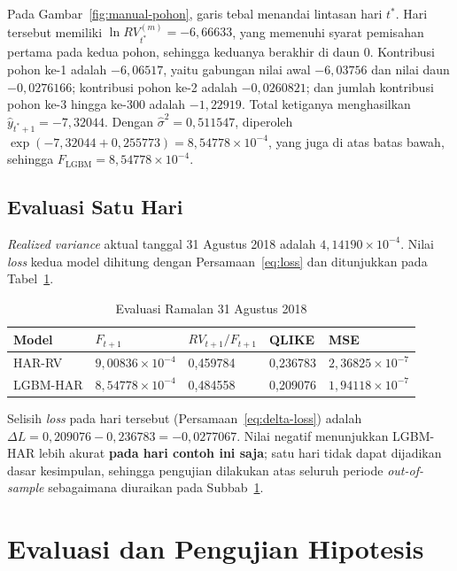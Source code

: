 Pada Gambar~\ref{fig:manual-pohon}, garis tebal menandai lintasan hari $t^*$.
Hari tersebut memiliki $\ln RV^{(m)}_{t^*} = -6{,}66633$, yang memenuhi syarat
pemisahan pertama pada kedua pohon, sehingga keduanya berakhir di daun 0.
Kontribusi pohon ke-1 adalah $-6{,}06517$, yaitu gabungan nilai awal
$-6{,}03756$ dan nilai daun $-0{,}0276166$; kontribusi pohon ke-2 adalah
$-0{,}0260821$; dan jumlah kontribusi pohon ke-3 hingga ke-300 adalah
$-1{,}22919$. Total ketiganya menghasilkan $\hat y_{t^*+1} = -7{,}32044$.
Dengan $\hat\sigma^2 = 0{,}511547$, diperoleh
$\exp(-7{,}32044 + 0{,}255773) = 8{,}54778 \times 10^{-4}$, yang juga di atas
batas bawah, sehingga $F_{\text{LGBM}} = 8{,}54778 \times 10^{-4}$.

\subsection{Evaluasi Satu Hari}
\textit{Realized variance} aktual tanggal 31 Agustus 2018 adalah
$4{,}14190 \times 10^{-4}$. Nilai \textit{loss} kedua model dihitung dengan
Persamaan~\eqref{eq:loss} dan ditunjukkan pada Tabel~\ref{tab:manual-loss}.

\begin{table}[htbp]
  \caption{Evaluasi Ramalan 31 Agustus 2018}
  \label{tab:manual-loss}
  \centering
  \begingroup
  \small
  \begin{tabular}{|l|l|l|l|l|}
    \hline
    \textbf{Model} & \textbf{$F_{t+1}$} & \textbf{$RV_{t+1}/F_{t+1}$} &
    \textbf{QLIKE} & \textbf{MSE} \\
    \hline
    HAR-RV & $9{,}00836 \times 10^{-4}$ & 0,459784 & 0,236783 &
      $2{,}36825 \times 10^{-7}$ \\
    \hline
    LGBM-HAR & $8{,}54778 \times 10^{-4}$ & 0,484558 & 0,209076 &
      $1{,}94118 \times 10^{-7}$ \\
    \hline
  \end{tabular}
  \endgroup
\end{table}

Selisih \textit{loss} pada hari tersebut (Persamaan~\eqref{eq:delta-loss})
adalah $\Delta L = 0{,}209076 - 0{,}236783 = -0{,}0277067$. Nilai negatif
menunjukkan LGBM-HAR lebih akurat \textbf{pada hari contoh ini saja}; satu
hari tidak dapat dijadikan dasar kesimpulan, sehingga pengujian dilakukan atas
seluruh periode \textit{out-of-sample} sebagaimana diuraikan pada Subbab~\ref{sec:evaluasi}.

\section{Evaluasi dan Pengujian Hipotesis}
\label{sec:evaluasi}

